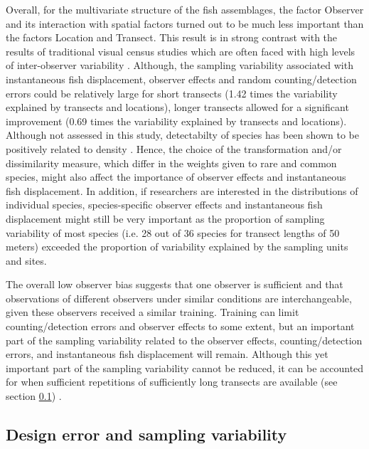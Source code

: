 \documentclass[10pt,letterpaper]{article}
\begin{document}
Overall, for the multivariate structure of the fish assemblages, the factor Observer and its interaction with spatial factors turned out to be much less important than the factors Location and Transect. This result is in strong contrast with the results of traditional visual census studies which are often faced with high levels of inter-observer variability \cite{Bernard2013,Edgar2004,Dickens2011,Tessier2013}. Although, the  sampling variability associated with  instantaneous fish displacement, observer effects and random counting/detection errors could be relatively large for short transects (1.42 times the variability explained by transects and locations), longer transects allowed for a significant improvement (0.69 times the variability explained by transects and locations). Although not assessed in this study, detectabilty of species has been shown to be positively related to density \cite{Dorazio2005}. Hence, the choice of the transformation and/or dissimilarity measure, which differ in the weights given to rare and common species, might also affect the importance of observer effects and instantaneous fish displacement. In addition, if researchers are interested in the distributions of individual species, species-specific observer effects and instantaneous fish displacement might still be very important as the proportion of sampling variability of most species (i.e. 28 out of 36 species for transect lengths of 50 meters) exceeded the proportion of variability explained by the sampling units and sites. 

The overall low observer bias suggests that one observer is sufficient and that observations of different observers under similar conditions are interchangeable, given these observers received a similar training. Training can limit counting/detection errors and observer effects to some extent, but an important part of the sampling variability related to the observer effects, counting/detection errors, and instantaneous fish displacement will remain. Although this  yet important part of the sampling variability cannot be reduced, it can be accounted for when sufficient repetitions of sufficiently long transects are available (see section \ref{4.2}) \cite{Irigoyen2013VariabilityCensus,Thompson1997}.

\subsection{Design error and sampling variability}
\label{4.2}
\end{document}
